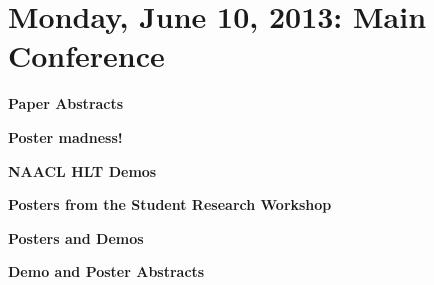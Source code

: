 \chapter{Monday, June 10, 2013: Main Conference}
\thispagestyle{emptyheader}

\newpage
\newpage
\newpage

\vspace{1em}\par\centerline{\bfseries\Large Paper Abstracts}\vspace{1em}\par
{}


\newpage

\vspace{1em}\par\centerline{\bfseries\Large Poster madness!}\vspace{1em}\par
{}

\noindent
\vspace{1em}\par\centerline{\bfseries NAACL HLT Demos}\vspace{1em}\par

\noindent


\noindent
\vspace{1em}\par\centerline{\bfseries Posters from the Student Research Workshop}\vspace{1em}\par

\noindent


\noindent
\vspace{1em}\par\centerline{\bfseries Posters and Demos}\vspace{1em}\par

\noindent


\noindent
\vspace{1em}\par\centerline{\bfseries\Large Demo and Poster Abstracts}\vspace{1em}\par
{}




